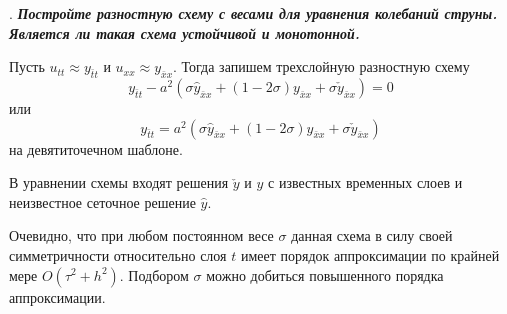 \documentclass[12pt, a4paper]{article}
\newcommand{\widecheck}[1]{\check{#1}}
\newcounter{mycounter}
\newcommand{\quastion}[1]{%
	\stepcounter{mycounter}%
	\textbf{\themycounter}.  %
	\textbf{\textit{#1}}
	
}
\begin{document}
	\quastion{Постройте разностную схему с весами для уравнения колебаний струны. Является ли такая схема устойчивой и монотонной.}
	
	Пусть $u_{tt} \approx y_{\bar{t}t} $ и $u_{xx} \approx y_{\bar{x}x} $. Тогда запишем трехслойную разностную схему
	\begin{equation}
		y_{\bar{t}t} - a^2 (\sigma \hat{y}_{\bar{x}x} + (1 - 2 \sigma) y_{\bar{x}x} + \sigma \widecheck{y}_{\bar{x}x}) = 0
	\end{equation}
	или
	\begin{equation*}
		y_{\bar{t}t} = a^2 (\sigma \hat{y}_{\bar{x}x} + (1 - 2 \sigma) y_{\bar{x}x} + \sigma \widecheck{y}_{\bar{x}x})
	\end{equation*}
	на девятиточечном шаблоне. 
	
	В уравнении схемы входят решения $\widecheck{y}$ и $y$ с известных временных слоев и неизвестное сеточное решение $\hat{y}$.
	
	Очевидно, что при любом постоянном весе $\sigma$ данная схема в силу своей симметричности относительно слоя $t$ имеет порядок аппроксимации по крайней мере $O(\tau^2 + h^2)$. Подбором $\sigma$ можно добиться повышенного порядка аппроксимации. 
	
\end{document}
